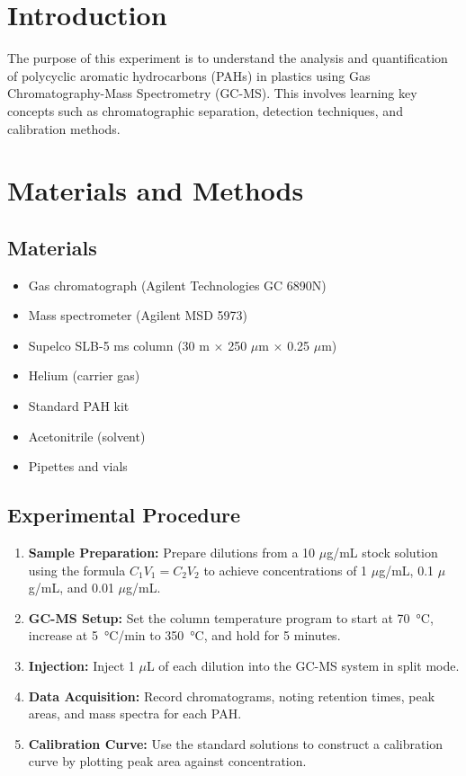 \documentclass{article}
\begin{document}
\section{Introduction}
The purpose of this experiment is to understand the analysis and quantification of polycyclic aromatic hydrocarbons (PAHs) in plastics using Gas Chromatography-Mass Spectrometry (GC-MS). This involves learning key concepts such as chromatographic separation, detection techniques, and calibration methods.

\section{Materials and Methods}
\subsection{Materials}
\begin{itemize}
    \item Gas chromatograph (Agilent Technologies GC 6890N)
    \item Mass spectrometer (Agilent MSD 5973)
    \item Supelco SLB-5 ms column (30 m $\times$ 250 $\mu$m $\times$ 0.25 $\mu$m)
    \item Helium (carrier gas)
    \item Standard PAH kit
    \item Acetonitrile (solvent)
    \item Pipettes and vials
\end{itemize}

\subsection{Experimental Procedure}
\begin{enumerate}
    \item \textbf{Sample Preparation:} Prepare dilutions from a 10 $\mu$g/mL stock solution using the formula \(C_1V_1 = C_2V_2\) to achieve concentrations of 1 $\mu$g/mL, 0.1 $\mu$g/mL, and 0.01 $\mu$g/mL.
    \item \textbf{GC-MS Setup:} Set the column temperature program to start at \SI{70}{\degreeCelsius}, increase at \SI{5}{\degreeCelsius}/min to \SI{350}{\degreeCelsius}, and hold for 5 minutes.
    \item \textbf{Injection:} Inject 1 $\mu$L of each dilution into the GC-MS system in split mode.
    \item \textbf{Data Acquisition:} Record chromatograms, noting retention times, peak areas, and mass spectra for each PAH.
    \item \textbf{Calibration Curve:} Use the standard solutions to construct a calibration curve by plotting peak area against concentration.
\end{enumerate}
\end{document}
